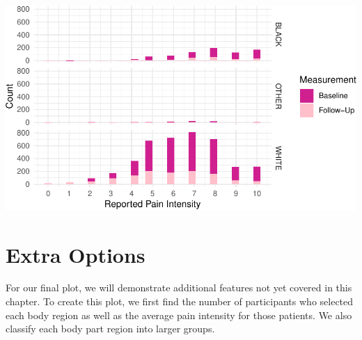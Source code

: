 \documentclass[
  letterpaper,
]{latex/krantz}
\begin{document}
\begin{center}
\includegraphics[width=1\textwidth,height=\textheight]{book/visualization_ggplot_files/figure-pdf/unnamed-chunk-20-1.pdf}
\end{center}

\section{Extra Options}\label{extra-options}

For our final plot, we will demonstrate additional features not yet
covered in this chapter. To create this plot, we first find the number
of participants who selected each body region as well as the average
pain intensity for those patients. We also classify each body part
region into larger groups.
\end{document}
